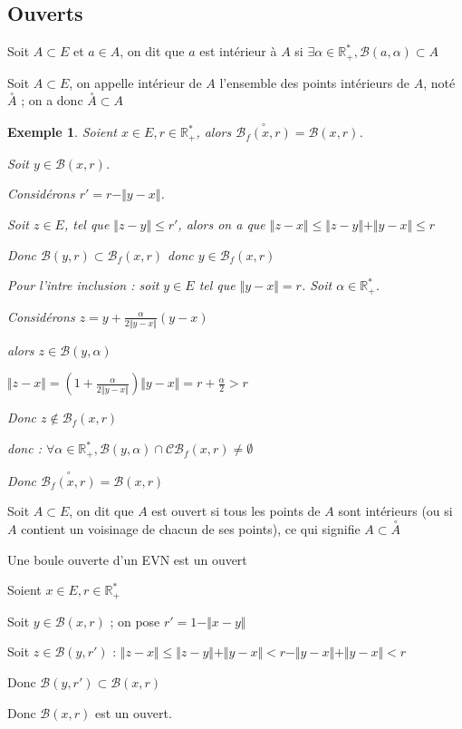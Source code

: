 \documentclass[a4paper,12pt]{book}
\newcommand{\Def}[2]{\begin{tcolorbox}[sharp corners, colback=white,colframe=blue!90!black!75, title=Définition : #1]#2\end{tcolorbox}}
\newcommand{\Prop}[2]{\begin{tcolorbox}[sharp corners, colback=white,colframe=red!90!black!75, title=Proposition : #1]#2\end{tcolorbox}}
\newcommand{\Pre}[1]{\begin{tcolorbox}[sharp corners, colback=white,colframe=green!60!green!30!black!75, title=Preuve]#1\end{tcolorbox}}
\newtheorem{Exe}{Exemple}[section]
\def\R{\mathbb{R}}
\begin{document}
\subsection{Ouverts}
\Def{Point intérieur}{Soit $A\subset E$ et $a\in A$, on dit que $a$ est intérieur à $A$ si $\exists\alpha\in\R_+^*,\mathcal{B}(a,\alpha)\subset A$}
\Def{Intérieur}{Soit $A\subset E$, on appelle intérieur de $A$ l'ensemble des points intérieurs de $A$, noté $\overset{\circ}{A}$ ; on a donc $\overset{\circ}{A}\subset A$}
\begin{Exe}
Soient $x\in E,r\in\R_+^*$, alors $\overset{\circ}{\mathcal{B}_f(x,r)} =\mathcal{B}(x,r)$.
\par Soit $y\in\mathcal{B}(x,r)$. \par Considérons $r'=r-\Vert y-x\Vert$. \par Soit $z\in E$, tel que $\Vert z-y\Vert \leq r'$, alors on a que $\Vert z-x\Vert\leq\Vert z-y\Vert + \Vert y-x\Vert\leq r$ \par Donc $\mathcal{B}(y,r)\subset \mathcal{B}_f(x,r)$ donc $y\in\mathcal{B}_f(x,r)$
\par Pour l'intre inclusion : soit $y\in E$ tel que $\Vert y-x\Vert=r$. Soit $\alpha\in\R_+^*$. \par Considérons $z=y+\frac{\alpha}{2\Vert y-x\Vert}(y-x)$ \par alors $z\in\mathcal{B}(y,\alpha)$ \par $\Vert z-x\Vert = (1+\frac{\alpha}{2\Vert y-x\Vert})\Vert y-x\Vert = r+\frac{\alpha}{2}>r$
\par Donc $z\notin\mathcal{B}_f(x,r)$ \par donc : $\forall\alpha\in\R_+^*, \mathcal{B}(y,\alpha)\cap\mathcal{CB}_f(x,r)\neq\emptyset$
\par Donc $\overset{\circ}{\mathcal{B}_f(x,r)}=\mathcal{B}(x,r)$
\end{Exe}
\Def{Ouvert}{Soit $A\subset E$, on dit que $A$ est ouvert si tous les points de $A$ sont intérieurs (ou si $A$ contient un voisinage de chacun de ses points), ce qui signifie $A\subset\overset{\circ}{A}$}
\Prop{Ouverture de la boule}{Une boule ouverte d'un EVN est un ouvert}
\Pre{Soient $x\in E,r\in\R_+^*$
\par Soit $y\in\mathcal{B}(x,r)$ ; on pose $r'=1-\Vert x-y\Vert$\par Soit $z\in\mathcal{B}(y,r')$ : $\Vert z-x\Vert\leq\Vert z-y\Vert + \Vert y-x\Vert < r -\Vert y-x\Vert + \Vert y-x\Vert < r$ \par Donc $\mathcal{B}(y,r')\subset\mathcal{B}(x,r)$\par Donc $\mathcal{B}(x,r)$ est un ouvert.}
\end{document}
